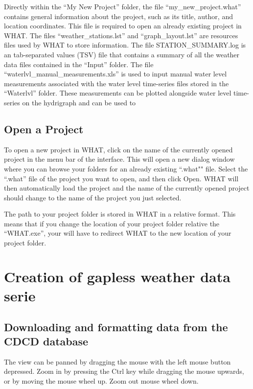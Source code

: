 \documentclass[12pt, letterpaper, fleqn]{report}
\begin{document}
Directly within the ``My New Project'' folder, the file ``my\_new\_project.what'' contains general information about the project, such as its title, author, and location coordinates. This file is required to open an already existing project in WHAT. The files ``weather\_stations.lst'' and ``graph\_layout.lst'' are resources files used by WHAT to store information. The file STATION\_SUMMARY.log is an tab-separated values (TSV) file that contains a summary of all the weather data files contained in the ``Input'' folder. The file ``waterlvl\_manual\_measurements.xls'' is used to input manual water level measurements associated with the water level time-series files stored in the ``Waterlvl'' folder. These measurements can be plotted alongside water level time-series on the hydrigraph and can be used to 

\subsection{Open a Project}

To open a new project in WHAT, click on the name of the currently opened project in the menu bar of the interface. This will open a new dialog window where you can browse your folders for an already existing ``.what"" file. Select the ``.what'' file of the project you want to open, and then click Open. WHAT will then automatically load the project and the name of the currently opened project should change to the name of the project you just selected.

The path to your project folder is stored in WHAT in a relative format. This means that if you change the location of your project folder relative the ``WHAT.exe'', your will have to redirect WHAT to the new location of your project folder.

\section{Creation of gapless weather data serie}



\subsection{Downloading and formatting data from the CDCD database}

The view can be panned by dragging the mouse with the left mouse button depressed. Zoom in by pressing the Ctrl key while dragging the mouse upwards, or by moving the mouse wheel up. Zoom out mouse wheel down.
\end{document}
